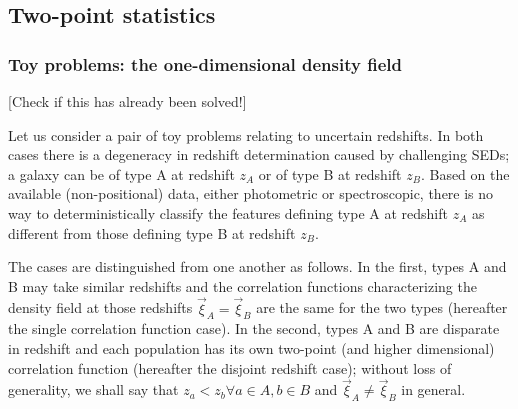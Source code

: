\documentclass[12pt, onecolumn]{emulateapj}
\begin{document}
%
%

\subsection{Two-point statistics}

\subsubsection{Toy problems: the one-dimensional density field}

[Check if this has already been solved!]

Let us consider a pair of toy problems relating to uncertain redshifts.  In both cases there is a degeneracy in redshift determination caused by challenging SEDs; a galaxy can be of type A at redshift $z_{A}$ or of type B at redshift $z_{B}$.  Based on the available (non-positional) data, either photometric or spectroscopic, there is no way to deterministically classify the features defining type A at redshift $z_{A}$ as different from those defining type B at redshift $z_{B}$.

The cases are distinguished from one another as follows.  In the first, types A and B may take similar redshifts and the correlation functions characterizing the density field at those redshifts $\vec{\xi}_{A}=\vec{\xi}_{B}$ are the same for the two types (hereafter the single correlation function case).  In the second, types A and B are disparate in redshift and each population has its own two-point (and higher dimensional) correlation function (hereafter the disjoint redshift case); without loss of generality, we shall say that $z_{a}<z_{b}\forall a\in A,b\in B$ and $\vec{\xi}_{A}\neq\vec{\xi}_{B}$ in general.
\end{document}
